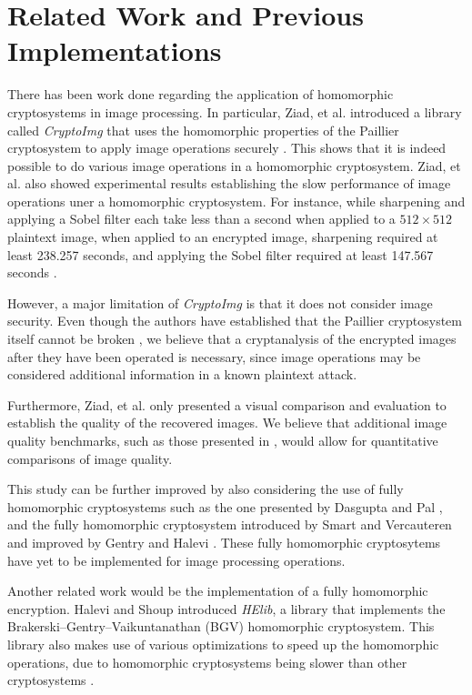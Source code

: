 \section{Related Work and Previous Implementations}





There has been work done regarding the application of homomorphic cryptosystems in image processing. In particular, Ziad, et al. introduced a library called \textit{CryptoImg} that uses the homomorphic properties of the Paillier cryptosystem to apply image operations securely \cite{ziad_cryptoimg:_2016}. This shows that it is indeed possible to do various image operations in a homomorphic cryptosystem. Ziad, et al. also showed experimental results establishing the slow performance of image operations uner a homomorphic cryptosystem. For instance, while sharpening and applying a Sobel filter each take less than a second when applied to a $512\times 512$ plaintext image, when applied to an encrypted image, sharpening required at least 238.257 seconds, and applying the Sobel filter required at least 147.567 seconds \cite{ziad_cryptoimg:_2016}.

However, a major limitation of \textit{CryptoImg} is that it does not consider image security. Even though the authors have established that the Paillier cryptosystem itself cannot be broken \cite{ziad_cryptoimg:_2016}, we believe that a cryptanalysis of the encrypted images after they have been operated is necessary, since image operations may be considered additional information in a known plaintext attack.

Furthermore, Ziad, et al. only presented a visual comparison and evaluation to establish the quality of the recovered images. We believe that additional image quality benchmarks, such as those presented in \cite{ahmed_benchmark_2016, ahmad_efficiency_2012}, would allow for quantitative comparisons of image quality.

This study can be further improved by also considering the use of fully homomorphic cryptosystems such as the one presented by Dasgupta and Pal \cite{dasgupta_design_2016}, and the fully homomorphic cryptosystem introduced by Smart and Vercauteren \cite{hutchison_fully_2010} and improved by Gentry and Halevi  \cite{hutchison_implementing_2011}. These fully homomorphic cryptosytems have yet to be implemented for image processing operations.

Another related work would be the implementation of a fully homomorphic encryption. Halevi and Shoup \cite{garay_algorithms_2014} introduced \textit{HElib}, a library that implements the Brakerski--Gentry--Vaikuntanathan (BGV) homomorphic cryptosystem. This library also makes use of various optimizations to speed up the homomorphic operations, due to homomorphic cryptosystems being slower than other cryptosystems \cite{sen_homomorphic_2013}.
